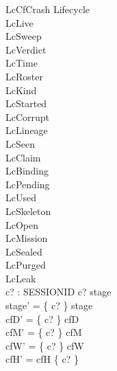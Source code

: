 \documentclass[a4paper,10pt,fleqn]{article}
\begin{document}
\begin{schema}{LcCfCrash}
\Delta Lifecycle \\
\Xi LcLive \\
\Xi LcSweep \\
\Xi LcVerdict \\
\Xi LcTime \\
\Xi LcRoster \\
\Xi LcKind \\
\Xi LcStarted \\
\Xi LcCorrupt \\
\Xi LcLineage \\
\Xi LcSeen \\
\Xi LcClaim \\
\Xi LcBinding \\
\Xi LcPending \\
\Xi LcUsed \\
\Xi LcSkeleton \\
\Xi LcOpen \\
\Xi LcMission \\
\Xi LcSealed \\
\Xi LcPurged \\
\Xi LcLeak \\
c? : SESSIONID
\where
c? \in \dom stage \\
stage' = \{ c? \} \ndres stage \\
cfD' = \{ c? \} \ndres cfD \\
cfM' = \{ c? \} \ndres cfM \\
cfW' = \{ c? \} \ndres cfW \\
cfH' = cfH \setminus \{ c? \}
\end{schema}
\end{document}
